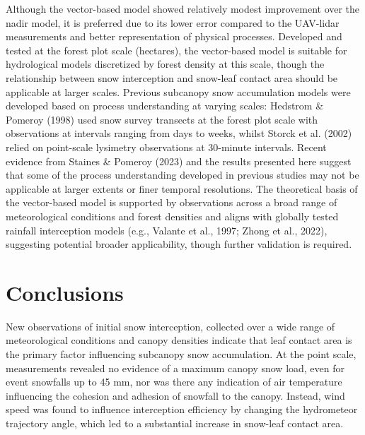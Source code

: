 \documentclass[
  letterpaper,
]{tex/uofsthesis-cs}
\begin{document}
Although the vector-based model showed relatively modest improvement
over the nadir model, it is preferred due to its lower error compared to
the UAV-lidar measurements and better representation of physical
processes. Developed and tested at the forest plot scale (hectares), the
vector-based model is suitable for hydrological models discretized by
forest density at this scale, though the relationship between snow
interception and snow-leaf contact area should be applicable at larger
scales. Previous subcanopy snow accumulation models were developed based
on process understanding at varying scales: Hedstrom \& Pomeroy (1998)
used snow survey transects at the forest plot scale with observations at
intervals ranging from days to weeks, whilst Storck et al. (2002) relied
on point-scale lysimetry observations at 30-minute intervals. Recent
evidence from Staines \& Pomeroy (2023) and the results presented here
suggest that some of the process understanding developed in previous
studies may not be applicable at larger extents or finer temporal
resolutions. The theoretical basis of the vector-based model is
supported by observations across a broad range of meteorological
conditions and forest densities and aligns with globally tested rainfall
interception models (e.g., Valante et al., 1997; Zhong et al., 2022),
suggesting potential broader applicability, though further validation is
required.

\section{Conclusions}\label{conclusions-1}

New observations of initial snow interception, collected over a wide
range of meteorological conditions and canopy densities indicate that
leaf contact area is the primary factor influencing subcanopy snow
accumulation. At the point scale, measurements revealed no evidence of a
maximum canopy snow load, even for event snowfalls up to 45 mm, nor was
there any indication of air temperature influencing the cohesion and
adhesion of snowfall to the canopy. Instead, wind speed was found to
influence interception efficiency by changing the hydrometeor trajectory
angle, which led to a substantial increase in snow-leaf contact area.
\end{document}
